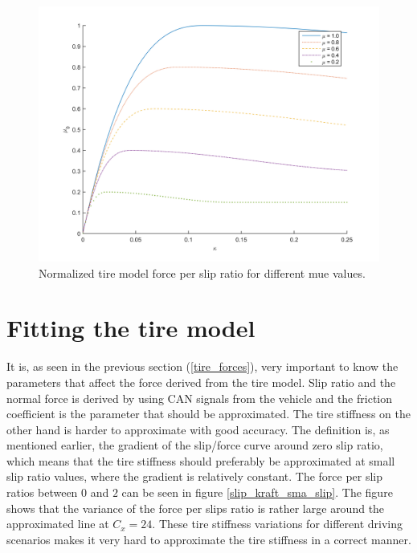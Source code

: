 \begin{figure}[h]
	\centering
	\includegraphics[width=1.0\textwidth]{Pictures/slipkraft_olika_mue}
	\caption {Normalized tire model force per slip ratio for different mue values.}
	\label{different_mue}
\end{figure}

\section{Fitting the tire model}
It is, as seen in the previous section (\ref{tire_forces}), very important to know the parameters that affect the force derived from the tire model. Slip ratio and the normal force is derived by using CAN signals from the vehicle and the friction coefficient is the parameter that should be approximated. The tire stiffness on the other hand is harder to approximate with good accuracy. The definition is, as mentioned earlier, the gradient of the slip/force curve around zero slip ratio, which means that the tire stiffness should preferably be approximated at small slip ratio values, where the gradient is relatively constant. The force per slip ratios between $ 0 $ and $ 2 $ can be seen in figure \ref{slip_kraft_sma_slip}. The figure shows that the variance of the force per slips ratio is rather large around the approximated line at $ C_{x} = 24 $. These tire stiffness variations for different driving scenarios makes it very hard to approximate the tire stiffness in a correct manner.

